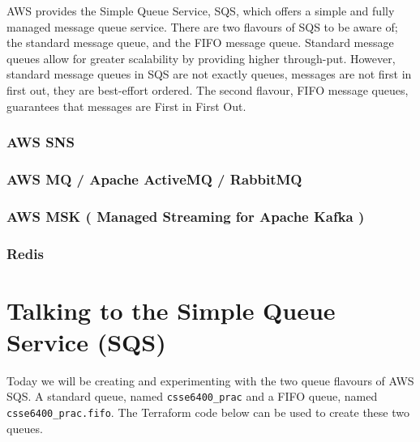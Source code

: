 \documentclass{csse4400}
\begin{document}
AWS provides the Simple Queue Service, SQS,
which offers a simple and fully managed message queue service.
There are two flavours of SQS to be aware of;
the standard message queue, and the FIFO message queue.
Standard message queues allow for greater scalability by providing higher through-put.
However, standard message queues in SQS are not exactly queues,
messages are not first in first out,
they are best-effort ordered.
The second flavour, FIFO message queues,
guarantees that messages are First in First Out.

\subsubsection{AWS SNS}

\subsubsection{AWS MQ / Apache ActiveMQ / RabbitMQ}


\subsubsection{AWS MSK ( Managed Streaming for Apache Kafka )}


\subsubsection{Redis}


\section{Talking to the Simple Queue Service (SQS)}


Today we will be creating and experimenting with the two queue flavours of AWS SQS.
A standard queue, named \texttt{csse6400\_prac} and a FIFO queue, named \texttt{csse6400\_prac.fifo}.
The Terraform code below can be used to create these two queues.
\end{document}
